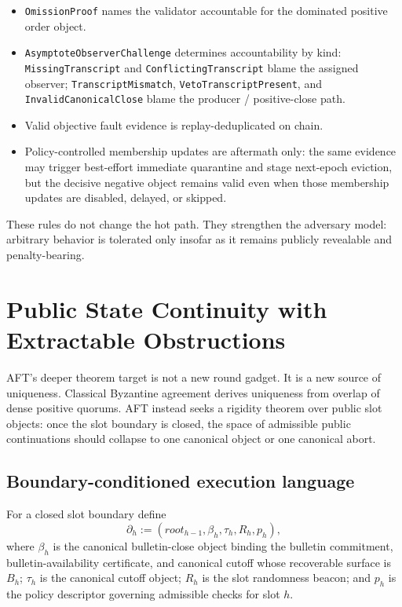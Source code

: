 \documentclass[11pt]{article}
\newcommand{\AFT}{\textsc{AFT}}
\newcommand{\code}[1]{\texttt{#1}}
\begin{document}
\begin{itemize}[leftmargin=1.5em]
\item \code{OmissionProof} names the validator accountable for the dominated
positive order object.
\item \code{AsymptoteObserverChallenge} determines accountability by kind:
\code{MissingTranscript} and \code{ConflictingTranscript} blame the assigned
observer; \code{TranscriptMismatch}, \code{VetoTranscriptPresent}, and
\code{InvalidCanonicalClose} blame the producer / positive-close path.
\item Valid objective fault evidence is replay-deduplicated on chain.
\item Policy-controlled membership updates are aftermath only: the same
evidence may trigger best-effort immediate quarantine and stage next-epoch
eviction, but the decisive negative object remains valid even when those
membership updates are disabled, delayed, or skipped.
\end{itemize}

These rules do not change the hot path. They strengthen the adversary model:
arbitrary behavior is tolerated only insofar as it remains publicly revealable
and penalty-bearing.

\section{Public State Continuity with Extractable Obstructions}
\label{sec:psc}

\AFT{}'s deeper theorem target is not a new round gadget. It is a new source of
uniqueness. Classical Byzantine agreement derives uniqueness from overlap of
dense positive quorums. \AFT{} instead seeks a rigidity theorem over public slot
objects: once the slot boundary is closed, the space of admissible public
continuations should collapse to one canonical object or one canonical abort.

\subsection{Boundary-conditioned execution language}

For a closed slot boundary define
\[
\partial_h := (root_{h-1}, \beta_h, \tau_h, R_h, p_h),
\]
where \(\beta_h\) is the canonical bulletin-close object binding the bulletin
commitment, bulletin-availability certificate, and canonical cutoff whose
recoverable surface is \(B_h\); \(\tau_h\) is the canonical cutoff object;
\(R_h\) is the slot randomness beacon; and \(p_h\) is the policy descriptor
governing admissible checks for slot \(h\).
\end{document}
